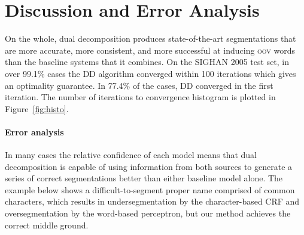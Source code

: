 \section{Discussion and Error Analysis}

On the whole, dual decomposition produces state-of-the-art segmentations that are more accurate, more consistent, and more successful at inducing \textsc{oov} words than the baseline systems that it combines.
On the SIGHAN 2005 test set, in over 99.1\% cases the DD algorithm converged within 100 iterations which gives an optimality guarantee. 
In 77.4\% of the cases, DD converged in the first iteration. The number of iterations to convergence histogram is plotted in Figure~\ref{fig:histo}.

\paragraph{Error analysis}


%
%
%
In many cases the relative confidence of each model means that dual decomposition is capable of using information from both sources to generate a series of correct segmentations better than either baseline model alone. The example below shows a difficult-to-segment proper name comprised of common characters, which results in undersegmentation by the character-based CRF and oversegmentation by the word-based perceptron, but our method achieves the correct middle ground.

